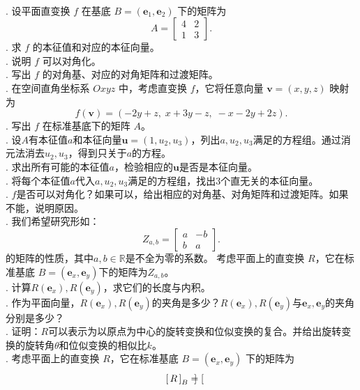 \documentclass[12pt,UTF8]{ctexbook}
\begin{document}
\begin{xt}
    \mbox{} \\
    . 设平面直变换 $f$ 在基底 $B=(\mathbf{e}_1,\mathbf{e}_2)$ 下的矩阵为
    \[
    A = \begin{bmatrix}
    4 & 2 \\
    1 & 3
    \end{bmatrix}.
    \]
    . 求 $f$ 的本征值和对应的本征向量。\\
    . 说明 $f$ 可以对角化。\\
    . 写出 $f$ 的对角基、对应的对角矩阵和过渡矩阵。\\
    . 在空间直角坐标系 $Oxyz$ 中，考虑直变换 $f$，它将任意向量 $\mathbf{v}=(x,y,z)$ 映射为
    \[
    f(\mathbf{v}) = (-2y + z,\; x + 3y -z,\; -x - 2y + 2z).
    \]
    . 写出 $f$ 在标准基底下的矩阵 $A$。\\
    . 设$A$有本征值$a$和本征向量$\mathbf{u} = (1,u_2,u_3)$，列出$a,u_2,u_3$满足的方程组。通过消元法消去$u_2,u_3$，得到只关于$a$的方程。\\
    . 求出所有可能的本征值$a$，检验相应的$\mathbf{u}$是否是本征向量。\\
    . 将每个本征值$a$代入$a,u_2,u_3$满足的方程组，找出$3$个直无关的本征向量。\\
    . $f$是否可以对角化？如果可以，给出相应的对角基、对角矩阵和过渡矩阵。如果不能，说明原因。\\
    . 我们希望研究形如：
    \[
    Z_{a,b} = \begin{bmatrix}
    a & -b \\   
    b & a
    \end{bmatrix}.
    \]
    的矩阵的性质，其中$a,b\in\mathbb{R}$是不全为零的系数。
    考虑平面上的直变换 $R$，它在标准基底 $B=(\mathbf{e}_x,\mathbf{e}_y)$下的矩阵为$Z_{a,b}$。\\
    . 计算$R(\mathbf{e}_x),R(\mathbf{e}_y)$，求它们的长度与内积。\\
    . 作为平面向量，$R(\mathbf{e}_x),R(\mathbf{e}_y)$的夹角是多少？$R(\mathbf{e}_x),R(\mathbf{e}_y)$与$\mathbf{e}_x,\mathbf{e}_y$的夹角分别是多少？\\
    . 证明：$R$可以表示为以原点为中心的旋转变换和位似变换的复合。并给出旋转变换的旋转角$\theta$和位似变换的相似比$k$。\\
    . 考虑平面上的直变换 $R$，它在标准基底 $B=(\mathbf{e}_x,\mathbf{e}_y)$ 下的矩阵为
    \[
    \bmat{R}[B] = \begin{bmatrix}

\end{bmatrix}\]
\end{xt}
\end{document}
